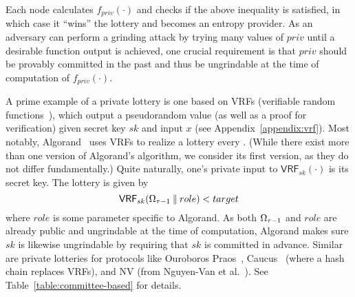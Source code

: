 Each node calculates $f_{priv}(\cdot)$ and checks if the above inequality is satisfied, in which case it ``wins'' the lottery and becomes an entropy provider. As an adversary can perform a grinding attack by trying many values of $priv$ until a desirable function output is achieved, one crucial requirement is that $priv$ should be provably committed in the past and thus be ungrindable at the time of computation of $f_{priv}(\cdot)$.

A prime example of a private lottery is one based on VRFs (verifiable random functions~\cite{micali1999verifiable,dodis2005verifiable}), which output a pseudorandom value (as well as a proof for verification) given secret key $sk$ and input $x$ (see Appendix~\ref{appendix:vrf}).
Most notably, Algorand~\cite{gilad2017algorand} uses VRFs to realize a lottery every \epoch. (While there exist more than one version of Algorand's algorithm, we consider its first version, as they do not differ fundamentally.) Quite naturally, one's private input to $\textsf{VRF}_{sk}(\cdot)$ is its secret key. The lottery is given by
\[
\textsf{VRF}_{sk}(\Omega_{\tau - 1} \mathbin\Vert role) < target
\]
where $role$ is some parameter specific to Algorand. As both $\Omega_{\tau - 1}$ and $role$ are already public and ungrindable at the time of computation, Algorand makes sure $sk$ is likewise ungrindable by requiring that $sk$ is committed in advance. Similar are private lotteries for protocols like Ouroboros Praos~\cite{david2018ouroboros}, Caucus~\cite{azouvi2018winning} (where a hash chain replaces VRFs), and NV (from Nguyen-Van et al.~\cite{nguyen2019scalable}). See Table~\ref{table:committee-based} for details.


